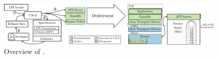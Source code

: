 \begin{figure}[!!thp!]
	\centering
    \includegraphics[width=\textwidth]{ava/images/overview.pdf}
    \caption{Overview of \model.
    }
    \label{fig:overview}
    \vspace*{-1em}
\end{figure}

